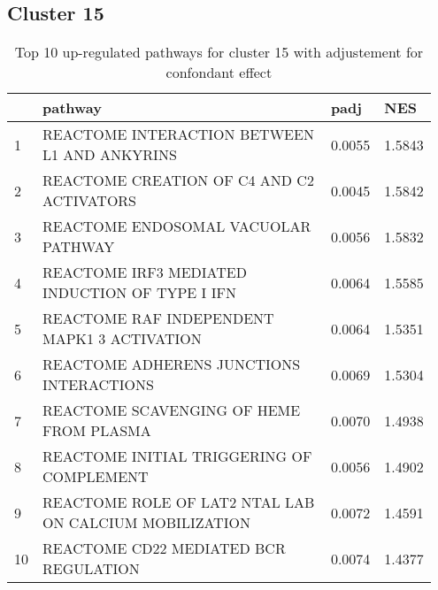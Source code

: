 \documentclass{article}
\begin{document}
\subsection{Cluster 15 }
\begin{table}[H]
\centering
\begin{tabular}{p{0.05\linewidth}p{0.7\linewidth}p{0.1\linewidth}p{0.1\linewidth}}
  \hline
 & pathway & padj & NES \\ 
  \hline
1 & REACTOME INTERACTION BETWEEN L1 AND ANKYRINS & 0.0055 & 1.5843 \\ 
  2 & REACTOME CREATION OF C4 AND C2 ACTIVATORS & 0.0045 & 1.5842 \\ 
  3 & REACTOME ENDOSOMAL VACUOLAR PATHWAY & 0.0056 & 1.5832 \\ 
  4 & REACTOME IRF3 MEDIATED INDUCTION OF TYPE I IFN & 0.0064 & 1.5585 \\ 
  5 & REACTOME RAF INDEPENDENT MAPK1 3 ACTIVATION & 0.0064 & 1.5351 \\ 
  6 & REACTOME ADHERENS JUNCTIONS INTERACTIONS & 0.0069 & 1.5304 \\ 
  7 & REACTOME SCAVENGING OF HEME FROM PLASMA & 0.0070 & 1.4938 \\ 
  8 & REACTOME INITIAL TRIGGERING OF COMPLEMENT & 0.0056 & 1.4902 \\ 
  9 & REACTOME ROLE OF LAT2 NTAL LAB ON CALCIUM MOBILIZATION & 0.0072 & 1.4591 \\ 
  10 & REACTOME CD22 MEDIATED BCR REGULATION & 0.0074 & 1.4377 \\ 
   \hline
\end{tabular}
\caption{Top 10 up-regulated pathways for cluster 15 with adjustement for confondant effect} 
\label{tab:q3_2_conf_15}
\end{table}
\end{document}

